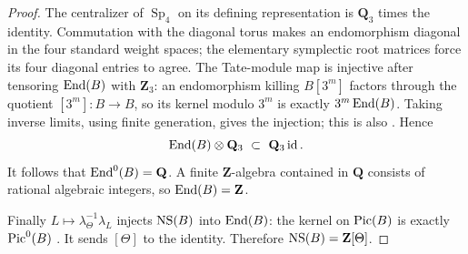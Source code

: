 \begin{proof}
The centralizer of $\operatorname{Sp}_4$ on its defining representation is $\mathbf Q_3$ times the identity. Commutation with the diagonal torus makes an endomorphism diagonal in the four standard weight spaces; the elementary symplectic root matrices force its four diagonal entries to agree. The Tate-module map is injective after tensoring $\operatorname{End}(B)$ with $\mathbf Z_3$: an endomorphism killing $B[3^m]$ factors through the quotient $[3^m]:B\to B$, so its kernel modulo $3^m$ is exactly $3^m\operatorname{End}(B)$. Taking inverse limits, using finite generation, gives the injection; this is also \citet[Lemmas~12.8--12.9, pp.~182--183]{EGM}. Hence
\[
      \operatorname{End}(B)\otimes\mathbf Q_3\ \subset\ \mathbf Q_3\operatorname{id}.
\]
It follows that $\operatorname{End}^0(B)=\mathbf Q$. A finite $\mathbf Z$-algebra contained in $\mathbf Q$ consists of rational algebraic integers, so $\operatorname{End}(B)=\mathbf Z$.

Finally $L\mapsto\lambda_\Theta^{-1}\lambda_L$ injects $\operatorname{NS}(B)$ into $\operatorname{End}(B)$: the kernel on $\operatorname{Pic}(B)$ is exactly $\operatorname{Pic}^0(B)$ \citep[\S\S7.22--7.26, pp.~106--108]{EGM}. It sends $[\Theta]$ to the identity. Therefore $\operatorname{NS}(B)=\mathbf Z[\Theta]$.
\end{proof}

